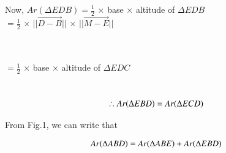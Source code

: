 \documentclass[journal,12pt,twocolumn]{IEEEtran}
\begin{document}
Now, $Ar(\Delta EDB) = \frac{1}{2}$ $\times$ base $\times$ altitude of $\Delta EDB$\\
\centering
\vspace{0.25cm}
\hspace{1.7cm}$= \frac{1}{2}$ $\times$ $||\vec{D-B}||$ $\times$ $||\vec{M-E}||$\\
\vspace{0.25cm}
\raggedright{} \vspace{0.25cm}\\          
\hspace{3.5cm}{[$\because$ ${||\vec{D}-\vec{B}||}={||\vec{C}-\vec{D}||}$]}\\
\vspace{0.25cm}
\centering
\hspace{2.45cm}$= \frac{1}{2}$ $\times$ base $\times$ altitude of $\Delta EDC$\\
\vspace{0.25cm}
\raggedright\hspace{2.95cm}{$=Ar(\Delta ECD)$}\\

\centering
\begin{align}
\therefore Ar(\Delta EBD)=Ar(\Delta ECD) \hspace{0.25cm} 
\label{eqn:2}
\end{align}

\raggedright
From Fig.1, we can write that\\
\centering

\begin{align}
 Ar(\Delta ABD) = Ar(\Delta ABE) + Ar(\Delta EBD)\hspace{0.25cm} 
 \label{eqn:3}
\end{align}
\end{document}
